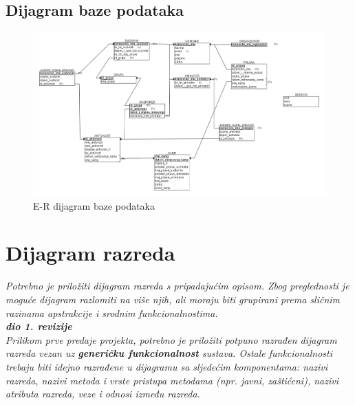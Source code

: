 			\eject
			
			
			\subsection{Dijagram baze podataka}
				\begin{figure}[H]
				\centerline{\includegraphics[width=\linewidth]{slike/ER_model_baze.png}}
				\caption{E-R dijagram baze podataka}
				\label{fig:ERdijagram}
			\end{figure}
			
			\eject
			
			
		\section{Dijagram razreda}
		
			\textit{Potrebno je priložiti dijagram razreda s pripadajućim opisom. Zbog preglednosti je moguće dijagram razlomiti na više njih, ali moraju biti grupirani prema sličnim razinama apstrakcije i srodnim funkcionalnostima.}\\
			
			\textbf{\textit{dio 1. revizije}}\\
			
			\textit{Prilikom prve predaje projekta, potrebno je priložiti potpuno razrađen dijagram razreda vezan uz \textbf{generičku funkcionalnost} sustava. Ostale funkcionalnosti trebaju biti idejno razrađene u dijagramu sa sljedećim komponentama: nazivi razreda, nazivi metoda i vrste pristupa metodama (npr. javni, zaštićeni), nazivi atributa razreda, veze i odnosi između razreda.}\\
			
